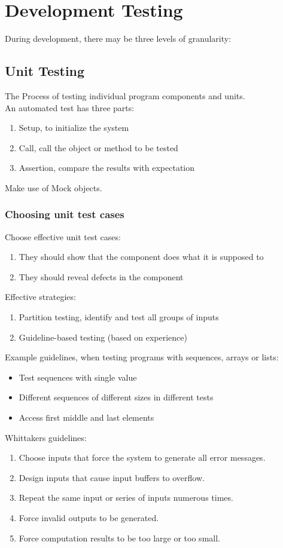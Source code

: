 \documentclass[a4paper,11pt,twocolumn]{report}
\begin{document}
    \section{Development Testing}
    During development, there may be three levels of granularity:
    \subsection{Unit Testing}
    The Process of testing individual program components and units.\\
    An automated test has three parts:\\
    \begin{enumerate}
        \item Setup, to initialize the system
        \item Call, call the object or method to be tested
        \item Assertion, compare the results with expectation
    \end{enumerate}
    Make use of Mock objects.
    \subsubsection{Choosing unit test cases}
    Choose effective unit test cases:
    \begin{enumerate}
        \item They should show that the component does what it is supposed to
        \item They should reveal defects in the component
    \end{enumerate}
    Effective strategies:
    \begin{enumerate}
        \item Partition testing, identify and test all groups of inputs
        \item Guideline-based testing (based on experience)
    \end{enumerate}
    Example guidelines, when testing programs with sequences, arrays or lists:
    \begin{itemize}
        \item Test sequences with single value
        \item Different sequences of different sizes in different tests
        \item Access first middle and last elements
    \end{itemize}
    Whittakers guidelines:
    \begin{enumerate}
        \item Choose inputs that force the system to generate all error
            messages.
        \item Design inputs that cause input buffers to overflow.
        \item Repeat the same input or series of inputs numerous times.
        \item Force invalid outputs to be generated.
        \item Force computation results to be too large or too small.
    \end{enumerate}
\end{document}
